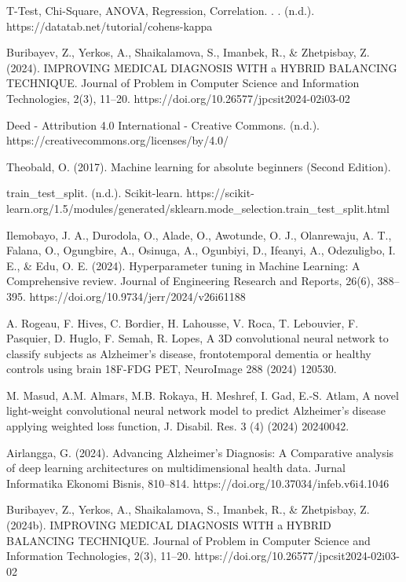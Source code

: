 \documentclass[conference]{IEEEtran} %
\begin{document}
\begin{thebibliography}{8}
T-Test, Chi-Square, ANOVA, Regression, Correlation. . . (n.d.). https://datatab.net/tutorial/cohens-kappa

Buribayev, Z., Yerkos, A., Shaikalamova, S., Imanbek, R., \& Zhetpisbay, Z. (2024). IMPROVING MEDICAL DIAGNOSIS WITH a HYBRID BALANCING TECHNIQUE. Journal of Problem in Computer Science and Information Technologies, 2(3), 11–20. https://doi.org/10.26577/jpcsit2024-02i03-02

Deed - Attribution 4.0 International - Creative Commons. (n.d.). https://creativecommons.org/licenses/by/4.0/

Theobald, O. (2017). Machine learning for absolute beginners (Second Edition).

train\_test\_split. (n.d.). Scikit-learn. https://scikit-learn.org/1.5/modules/generated/sklearn.mode\_selection.train\_test\_split.html

Ilemobayo, J. A., Durodola, O., Alade, O., Awotunde, O. J., Olanrewaju, A. T., Falana, O., Ogungbire, A., Osinuga, A., Ogunbiyi, D., Ifeanyi, A., Odezuligbo, I. E., \& Edu, O. E. (2024). Hyperparameter tuning in Machine Learning: A Comprehensive review. Journal of Engineering Research and Reports, 26(6), 388–395. https://doi.org/10.9734/jerr/2024/v26i61188

A. Rogeau, F. Hives, C. Bordier, H. Lahousse, V. Roca, T. Lebouvier, F. Pasquier,
D. Huglo, F. Semah, R. Lopes, A 3D convolutional neural network to classify
subjects as Alzheimer’s disease, frontotemporal dementia or healthy controls
using brain 18F-FDG PET, NeuroImage 288 (2024) 120530.

M. Masud, A.M. Almars, M.B. Rokaya, H. Meshref, I. Gad, E.-S. Atlam, A novel
light-weight convolutional neural network model to predict Alzheimer’s disease
applying weighted loss function, J. Disabil. Res. 3 (4) (2024) 20240042.

Airlangga, G. (2024). Advancing Alzheimer’s Diagnosis: A Comparative analysis of deep learning architectures on multidimensional health data. Jurnal Informatika Ekonomi Bisnis, 810–814. https://doi.org/10.37034/infeb.v6i4.1046


Buribayev, Z., Yerkos, A., Shaikalamova, S., Imanbek, R., \& Zhetpisbay, Z. (2024b). IMPROVING MEDICAL DIAGNOSIS WITH a HYBRID BALANCING TECHNIQUE. Journal of Problem in Computer Science and Information Technologies, 2(3), 11–20. https://doi.org/10.26577/jpcsit2024-02i03-02


\end{thebibliography}


\end{document}
